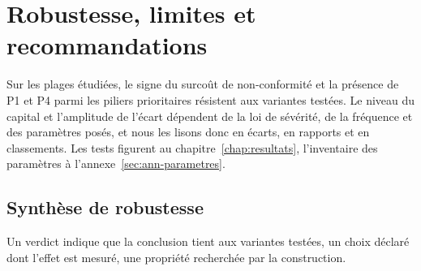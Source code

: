 
\chapter{Robustesse, limites et recommandations}
\label{ch:robustesse}
\label{part:limites}

Sur les plages étudiées, le signe du surcoût de non-conformité et la présence de P1 et P4
parmi les piliers prioritaires résistent aux variantes testées. Le niveau du capital et l'amplitude
de l'écart dépendent de la loi de sévérité, de la fréquence et des paramètres posés, et nous les
lisons donc en écarts, en rapports et en classements. Les tests figurent au
chapitre~\ref{chap:resultats}, l'inventaire des paramètres à l'annexe~\ref{sec:ann-parametres}.

\section{Synthèse de robustesse}

Un verdict \rob{} indique que la conclusion tient aux variantes testées, \ass{} un choix déclaré dont l'effet est
mesuré, \feat{} une propriété recherchée par la construction.

